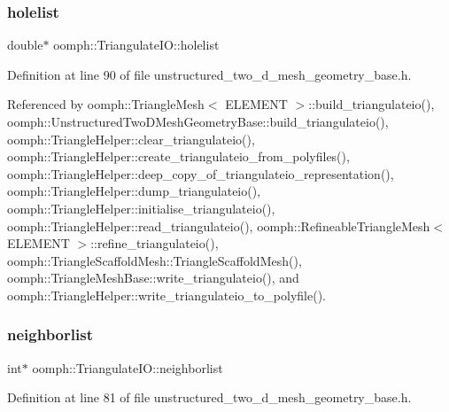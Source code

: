 \mbox{\label{structoomph_1_1TriangulateIO_ab6a245bf3c2ed27265e34770e3ac72b4}} 
\subsubsection{\texorpdfstring{holelist}{holelist}}
{\footnotesize\ttfamily double$\ast$ oomph\+::\+Triangulate\+I\+O\+::holelist}



Definition at line 90 of file unstructured\+\_\+two\+\_\+d\+\_\+mesh\+\_\+geometry\+\_\+base.\+h.



Referenced by oomph\+::\+Triangle\+Mesh$<$ E\+L\+E\+M\+E\+N\+T $>$\+::build\+\_\+triangulateio(), oomph\+::\+Unstructured\+Two\+D\+Mesh\+Geometry\+Base\+::build\+\_\+triangulateio(), oomph\+::\+Triangle\+Helper\+::clear\+\_\+triangulateio(), oomph\+::\+Triangle\+Helper\+::create\+\_\+triangulateio\+\_\+from\+\_\+polyfiles(), oomph\+::\+Triangle\+Helper\+::deep\+\_\+copy\+\_\+of\+\_\+triangulateio\+\_\+representation(), oomph\+::\+Triangle\+Helper\+::dump\+\_\+triangulateio(), oomph\+::\+Triangle\+Helper\+::initialise\+\_\+triangulateio(), oomph\+::\+Triangle\+Helper\+::read\+\_\+triangulateio(), oomph\+::\+Refineable\+Triangle\+Mesh$<$ E\+L\+E\+M\+E\+N\+T $>$\+::refine\+\_\+triangulateio(), oomph\+::\+Triangle\+Scaffold\+Mesh\+::\+Triangle\+Scaffold\+Mesh(), oomph\+::\+Triangle\+Mesh\+Base\+::write\+\_\+triangulateio(), and oomph\+::\+Triangle\+Helper\+::write\+\_\+triangulateio\+\_\+to\+\_\+polyfile().

\mbox{\label{structoomph_1_1TriangulateIO_a3f0a3004099431cc5f5a7293b24663d6}} 
\subsubsection{\texorpdfstring{neighborlist}{neighborlist}}
{\footnotesize\ttfamily int$\ast$ oomph\+::\+Triangulate\+I\+O\+::neighborlist}



Definition at line 81 of file unstructured\+\_\+two\+\_\+d\+\_\+mesh\+\_\+geometry\+\_\+base.\+h.



